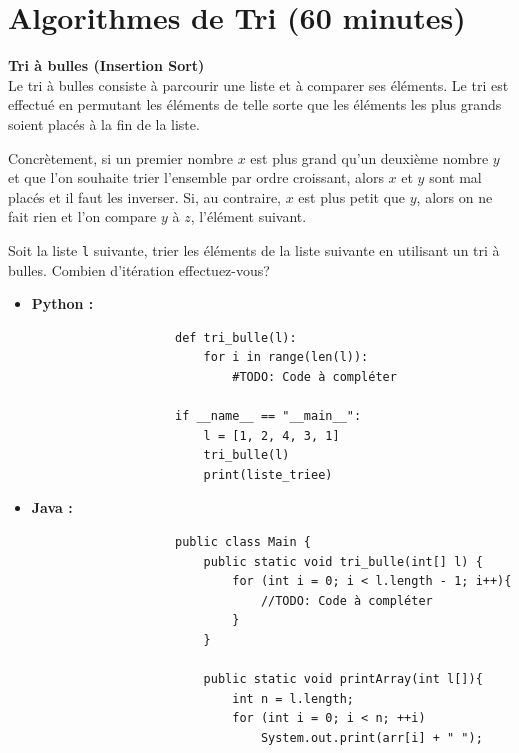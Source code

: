 \section{Algorithmes de Tri (60 minutes)}

\begin{Exercice} [20 minutes] \textbf{Tri à bulles (Insertion Sort)} \\
Le tri à bulles consiste à parcourir une liste et à comparer ses éléments. Le tri est effectué en permutant les éléments de telle sorte que les éléments les plus grands soient placés à la fin de la liste. 

Concrètement, si un premier nombre $x$ est plus grand qu'un deuxième nombre $y$ et que l'on souhaite trier l'ensemble par ordre croissant, alors $x$ et $y$ sont mal placés et il faut les inverser. Si, au contraire, $x$ est plus petit que $y$, alors on ne fait rien et l'on compare $y$ à $z$, l'élément suivant.

Soit la liste \lstinline{l} suivante, trier les éléments de la liste suivante en utilisant un tri à bulles. Combien d'itération effectuez-vous?

\begin{itemize}
        \item \textbf{Python :}
                \begin{verbatim}
                    def tri_bulle(l):
                        for i in range(len(l)):
                            #TODO: Code à compléter
                    
                    if __name__ == "__main__":
                        l = [1, 2, 4, 3, 1]
                        tri_bulle(l)
                        print(liste_triee)
                \end{verbatim}
        \item \textbf{Java :}
                \begin{verbatim}
                    public class Main {
                        public static void tri_bulle(int[] l) {
                            for (int i = 0; i < l.length - 1; i++){
                                //TODO: Code à compléter 
                            }
                        }
                        
                        public static void printArray(int l[]){ 
                            int n = l.length; 
                            for (int i = 0; i < n; ++i) 
                                System.out.print(arr[i] + " "); 
                      

\end{verbatim}
\end{itemize}
\end{Exercice}
